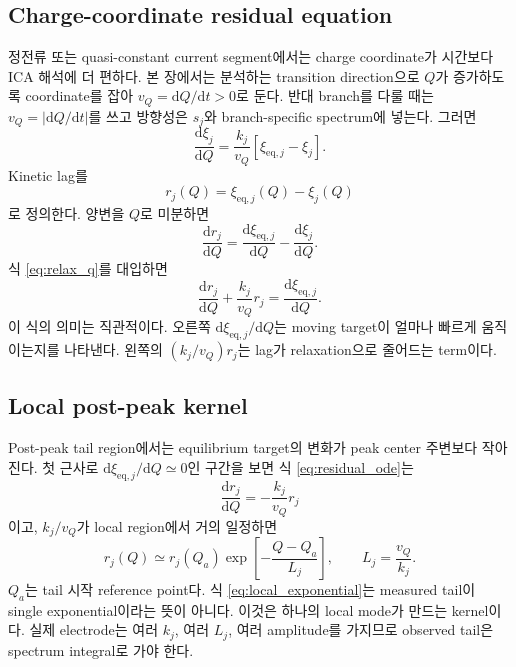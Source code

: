 \documentclass[11pt]{article}
\newcommand{\dd}{\mathrm{d}}
\newcommand{\eq}{\mathrm{eq}}
\begin{document}
\subsection{Charge-coordinate residual equation}\label{subsec:residual}

정전류 또는 quasi-constant current segment에서는 charge coordinate가 시간보다 ICA 해석에 더
편하다. 본 장에서는 분석하는 transition direction으로 \(Q\)가 증가하도록 coordinate를 잡아
\(v_Q=\dd Q/\dd t>0\)로 둔다. 반대 branch를 다룰 때는 \(v_Q=|\dd Q/\dd t|\)를 쓰고 방향성은
\(s_j\)와 branch-specific spectrum에 넣는다. 그러면
\begin{equation}
\frac{\dd \xi_j}{\dd Q}
=
\frac{k_j}{v_Q}
\left[
\xi_{\eq,j}-\xi_j
\right].
\label{eq:relax_q}
\end{equation}
Kinetic lag를
\begin{equation}
r_j(Q)=\xi_{\eq,j}(Q)-\xi_j(Q)
\label{eq:residual_def}
\end{equation}
로 정의한다. 양변을 \(Q\)로 미분하면
\begin{equation}
\frac{\dd r_j}{\dd Q}
=
\frac{\dd \xi_{\eq,j}}{\dd Q}
-
\frac{\dd \xi_j}{\dd Q}.
\label{eq:residual_diff_1}
\end{equation}
식 \eqref{eq:relax_q}를 대입하면
\begin{equation}
\boxed{
\frac{\dd r_j}{\dd Q}
+
\frac{k_j}{v_Q}r_j
=
\frac{\dd \xi_{\eq,j}}{\dd Q}.
}
\label{eq:residual_ode}
\end{equation}
이 식의 의미는 직관적이다. 오른쪽 \(\dd\xi_{\eq,j}/\dd Q\)는 moving target이 얼마나 빠르게
움직이는지를 나타낸다. 왼쪽의 \((k_j/v_Q)r_j\)는 lag가 relaxation으로 줄어드는 term이다.

\subsection{Local post-peak kernel}\label{subsec:local_kernel}

Post-peak tail region에서는 equilibrium target의 변화가 peak center 주변보다 작아진다. 첫 근사로
\(\dd\xi_{\eq,j}/\dd Q\simeq0\)인 구간을 보면 식 \eqref{eq:residual_ode}는
\begin{equation}
\frac{\dd r_j}{\dd Q}
=
-
\frac{k_j}{v_Q}r_j
\label{eq:residual_decay}
\end{equation}
이고, \(k_j/v_Q\)가 local region에서 거의 일정하면
\begin{equation}
\boxed{
r_j(Q)
\simeq
r_j(Q_a)
\exp\!\left[-\frac{Q-Q_a}{L_j}\right],
\qquad
L_j=\frac{v_Q}{k_j}.
}
\label{eq:local_exponential}
\end{equation}
\(Q_a\)는 tail 시작 reference point다. 식 \eqref{eq:local_exponential}는 measured tail이
single exponential이라는 뜻이 아니다. 이것은 하나의 local mode가 만드는 kernel이다. 실제 electrode는
여러 \(k_j\), 여러 \(L_j\), 여러 amplitude를 가지므로 observed tail은 spectrum integral로 가야 한다.
\end{document}
